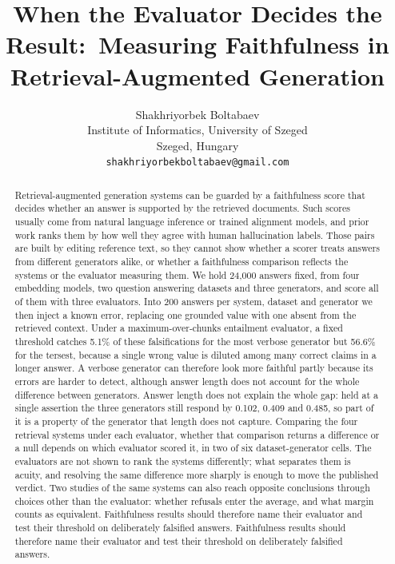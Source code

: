 \documentclass[11pt]{article}
\title{When the Evaluator Decides the Result:\
       Measuring Faithfulness in Retrieval-Augmented Generation}
\author{Shakhriyorbek Boltabaev \\
  Institute of Informatics, University of Szeged \\
  Szeged, Hungary \\
  \texttt{shakhriyorbekboltabaev@gmail.com}}
\begin{document}
\maketitle

\begin{abstract}
Retrieval-augmented generation systems can be guarded by a faithfulness score that decides whether an answer is supported by the retrieved documents. Such scores usually come from natural language inference or trained alignment models, and prior work ranks them by how well they agree with human hallucination labels. Those pairs are built by editing reference text, so they cannot show whether a scorer treats answers from different generators alike, or whether a faithfulness comparison reflects the systems or the evaluator measuring them. We hold 24,000 answers fixed, from four embedding models, two question answering datasets and three generators, and score all of them with three evaluators. Into 200 answers per system, dataset and generator we then inject a known error, replacing one grounded value with one absent from the retrieved context. Under a maximum-over-chunks entailment evaluator, a fixed threshold catches 5.1\% of these falsifications for the most verbose generator but 56.6\% for the tersest, because a single wrong value is diluted among many correct claims in a longer answer. A verbose generator can therefore look more faithful partly because its errors are harder to detect, although answer length does not account for the whole difference between generators. Answer length does not explain the whole gap: held at a single assertion the three generators still respond by 0.102, 0.409 and 0.485, so part of it is a property of the generator that length does not capture. Comparing the four retrieval systems under each evaluator, whether that comparison returns a difference or a null depends on which evaluator scored it, in two of six dataset-generator cells. The evaluators are not shown to rank the systems differently; what separates them is acuity, and resolving the same difference more sharply is enough to move the published verdict. Two studies of the same systems can also reach opposite conclusions through choices other than the evaluator: whether refusals enter the average, and what margin counts as equivalent. Faithfulness results should therefore name their evaluator and test their threshold on deliberately falsified answers. Faithfulness results should therefore name their evaluator and test their threshold on deliberately falsified answers.
\end{abstract}
\end{document}
